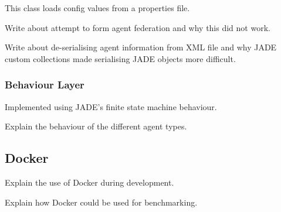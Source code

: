 This class loads config values from a properties file.

Write about attempt to form agent federation and why this did not work.

Write about de-serialising agent information from XML file and why JADE custom collections made serialising JADE objects more difficult.

\subsubsection{Behaviour Layer}

Implemented using JADE's finite state machine behaviour.

Explain the behaviour of the different agent types.

\subsection{Docker}

Explain the use of Docker during development.

Explain how Docker could be used for benchmarking.





